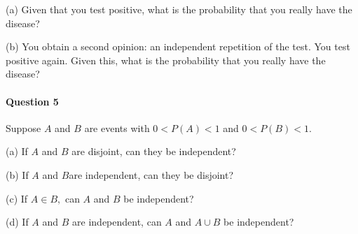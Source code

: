 \documentclass[11pt]{article} %
\begin{document}
(a) Given that you test positive, what is the probability that you really have the disease?

(b) You obtain a second opinion: an independent repetition of the test. You test positive again. Given this, what is the probability that you
really have the disease?

\paragraph*{Question 5}
Suppose $A$ and $B$ are events with $0 < P (A) < 1$ and $0 <
P (B) < 1$.

(a) If $A$ and $B$ are disjoint, can they be independent?

(b) If $A$ and $B $are independent, can they be disjoint?

(c) If $A \in B,$ can $A$ and $B$ be independent?

(d) If $A$ and $B$ are independent, can $A$ and $A \cup B$ be independent?
\end{document}
